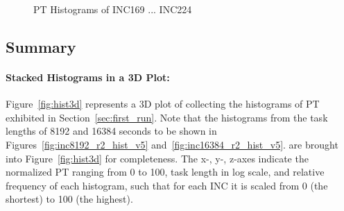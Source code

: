 \begin{figure}[hp!]
{		\label{fig:inc192_pt_hist}
	}
	\caption{PT Histograms of INC169 ... INC224~\label{fig:new_pt_hist4}}
\end{figure}

\pagebreak
\newpage

\subsection{Summary}

\paragraph{Stacked Histograms in a 3D Plot:}
Figure~\ref{fig:hist3d} represents a 3D plot of collecting the histograms of PT 
exhibited in Section~\ref{sec:first_run}. 
Note that the histograms from the task lengths of 8192 and 16384 seconds 
to be shown in Figures~\ref{fig:inc8192_r2_hist_v5} and~\ref{fig:inc16384_r2_hist_v5}. 
are brought into Figure~\ref{fig:hist3d} for completeness. The x-, y-, z-axes 
indicate the normalized PT ranging from 0 to 100, task length in log scale, 
and relative frequency of each histogram, such that for each INC 
it is scaled from 0 (the shortest) to 100 (the highest). 

